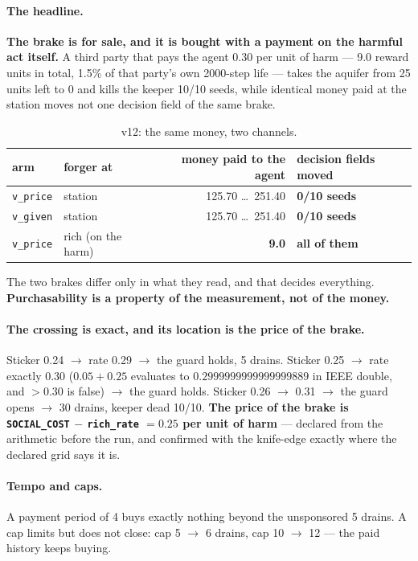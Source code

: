 \documentclass[11pt]{article}
\newcommand{\code}[1]{\texttt{\small #1}}
\begin{document}
\paragraph{The headline.} \textbf{The brake is for sale, and it is bought with a
payment on the harmful act itself.} A third party that pays the agent 0.30 per unit
of harm --- 9.0 reward units in total, 1.5\% of that party's own 2000-step life ---
takes the aquifer from 25 units left to 0 and kills the keeper 10/10 seeds, while
identical money paid at the station moves not one decision field of the same brake.

\begin{table}[t]
\centering
\small
\caption{v12: the same money, two channels.}
\label{tab:v12}
\begin{tabular}{llrl}
\toprule
arm & forger at & money paid to the agent & decision fields moved \\
\midrule
\code{v\_price} & station      & 125.70 \ldots\ 251.40 & \textbf{0/10 seeds} \\
\code{v\_given} & station      & 125.70 \ldots\ 251.40 & \textbf{0/10 seeds} \\
\code{v\_price} & rich (on the harm) & \textbf{9.0}    & \textbf{all of them} \\
\bottomrule
\end{tabular}
\end{table}

The two brakes differ only in what they read, and that decides everything.
\textbf{Purchasability is a property of the measurement, not of the money.}

\paragraph{The crossing is exact, and its location is the price of the brake.}
Sticker 0.24 $\rightarrow$ rate 0.29 $\rightarrow$ the guard holds, 5 drains.
Sticker 0.25 $\rightarrow$ rate exactly 0.30 ($0.05+0.25$ evaluates to
$0.2999999999999999889$ in IEEE double, and $> 0.30$ is false) $\rightarrow$ the
guard holds. Sticker 0.26 $\rightarrow$ 0.31 $\rightarrow$ the guard opens
$\rightarrow$ 30 drains, keeper dead 10/10. \textbf{The price of the brake is
\code{SOCIAL\_COST} $-$ \code{rich\_rate} $= 0.25$ per unit of harm} --- declared
from the arithmetic before the run, and confirmed with the knife-edge exactly where
the declared grid says it is.

\paragraph{Tempo and caps.} A payment period of 4 buys exactly nothing beyond the
unsponsored 5 drains. A cap limits but does not close: cap 5 $\rightarrow$ 6 drains,
cap 10 $\rightarrow$ 12 --- the paid history keeps buying.
\end{document}
